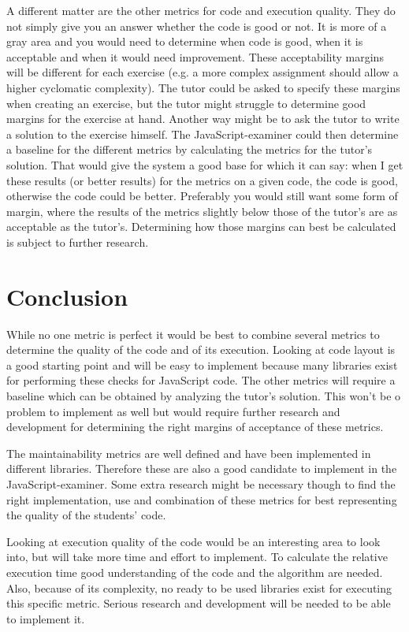 \documentclass{article}
\begin{document}
A different matter are the other metrics for code and execution quality. They
do not simply give you an answer whether the code is good or not. It is more of
a gray area and you would need to determine when code is good, when it is
acceptable and when it would need improvement. These acceptability margins will
be different for each exercise (e.g. a more complex assignment should allow a
higher cyclomatic complexity). The tutor could be asked to specify these
margins when creating an exercise, but the tutor might struggle to
determine good margins for the exercise at hand. Another way might be to ask
the tutor to write a solution to the exercise himself. The
JavaScript-examiner could then determine a baseline for the different metrics
by calculating the metrics for the tutor's solution. That would give the
system a good base for which it can say: when I get these results (or better
results) for the metrics on a given code, the code is good, otherwise the code
could be better. Preferably you would still want some form of margin, where the
results of the metrics slightly below those of the tutor's are as acceptable as
the tutor's. Determining how those margins can best be calculated is subject to
further research.

\section{Conclusion}

While no one metric is perfect it would be best to combine several metrics to
determine the quality of the code and of its execution. Looking at code layout
is a good starting point and will be easy to implement because many libraries
exist for performing these checks for JavaScript code. The other metrics will
require a baseline which can be obtained by analyzing the tutor's
solution. This won't be o problem to implement as well but would require
further research and development for determining the right margins of
acceptance of these metrics.

The maintainability metrics are well defined and have been implemented in
different libraries. Therefore these are also a good candidate to implement in
the JavaScript-examiner. Some extra research might be necessary though to find
the right implementation, use and combination of these metrics for best
representing the quality of the students' code.

Looking at execution quality of the code would be an interesting area to look
into, but will take more time and effort to implement. To calculate the
relative execution time good understanding of the code and the algorithm are
needed. Also, because of its complexity, no ready to be used libraries exist
for executing this specific metric. Serious research and development will be
needed to be able to implement it.
\end{document}
